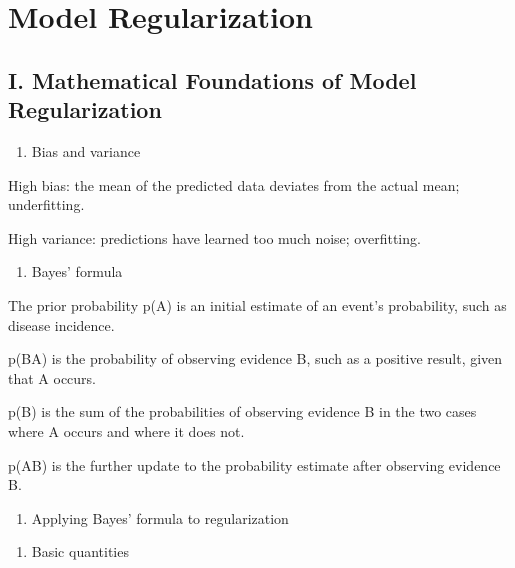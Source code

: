 \setcounter{section}{0}

\hypertarget{model-regularization}{%
\section{Model Regularization}\label{model-regularization}}

\hypertarget{i.-mathematical-foundations-of-model-regularization}{%
\subsection{I. Mathematical Foundations of Model Regularization}\label{i.-mathematical-foundations-of-model-regularization}}

\begin{enumerate}
\def\labelenumi{\arabic{enumi}.}
\tightlist
\item
  Bias and variance
\end{enumerate}

High bias: the mean of the predicted data deviates from the actual mean; underfitting.

High variance: predictions have learned too much noise; overfitting.

\begin{enumerate}
\def\labelenumi{\arabic{enumi}.}
\setcounter{enumi}{1}
\tightlist
\item
  Bayes' formula
\end{enumerate}

The prior probability p(A) is an initial estimate of an event's probability, such as disease incidence.

p(B\textbar A) is the probability of observing evidence B, such as a positive result, given that A occurs.

p(B) is the sum of the probabilities of observing evidence B in the two cases where A occurs and where it does not.

p(A\textbar B) is the further update to the probability estimate after observing evidence B.

\begin{enumerate}
\def\labelenumi{\arabic{enumi}.}
\setcounter{enumi}{2}
\tightlist
\item
  Applying Bayes' formula to regularization
\end{enumerate}

\begin{enumerate}
\def\labelenumi{(\arabic{enumi})}
\tightlist
\item
  Basic quantities
\end{enumerate}

